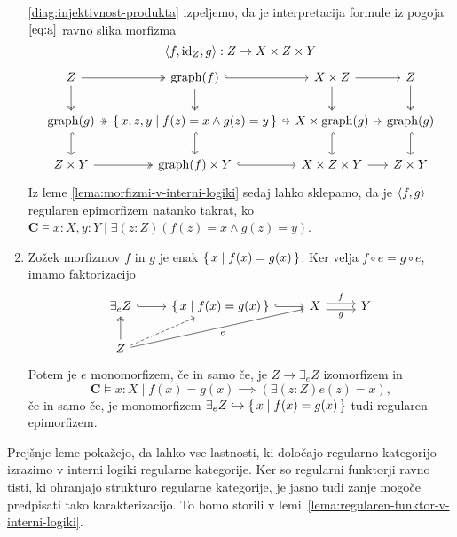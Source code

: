 \documentclass[../kategoricna_logika.tex]{subfiles}
\begin{document}
\begin{dokaz}
\begin{enumerate}[label=(\roman*)]
      \eqref{diag:injektivnost-produkta} izpeljemo, da je
      interpretacija formule iz pogoja $\eqref{eq:a}$ ravno slika morfizma
      \[\langle f, \mathrm{id}_{Z}, g \rangle : Z \to X \times Z \times Y\]
      \begin{equation*}
        \begin{tikzcd}[column sep=tiny]
          Z \ar[d, two heads] \ar[r, two heads] & \mathrm{graph}(f)
          \ar[d, two heads] \ar[r, hook] &
          X \times Z \ar[d, two heads] \ar[r] & Z \ar[d, two heads] \\
          \mathrm{graph}(g) \ar[d, hook] \ar[r, two heads] &
          \set{x,z,y \mid f(z) = x \land g(z) = y} \ar[d, hook] \ar[r,
          hook] & X \times \mathrm{graph}(g) \ar[d, hook] \ar[r] &
          \mathrm{graph}(g) \ar[d, hook] \\
          Z \times Y \ar[r, two heads] & \mathrm{graph}(f) \times Y
          \ar[r, hook] & X \times Z \times Y \ar[r] & Z \times Y
        \end{tikzcd}
      \end{equation*}
      Iz leme \ref{lema:morfizmi-v-interni-logiki} sedaj lahko
      sklepamo, da je $\langle f,g \rangle$ regularen epimorfizem natanko
      takrat, ko
      $\mathbf{C} \models x:X,y:Y \mid \exists (z:Z) (f(z) = x \land g(z) = y)$.
      
    \item Zožek morfizmov $f$ in $g$ je enak
      $\lbrace\,x \mid f(x) = g(x)\,\rbrace$.  Ker velja
      ${f \circ e = g \circ e}$, imamo faktorizacijo
      \begin{equation*}
        \begin{tikzcd}
          \exists_{e}Z \ar[r, hook] & \set{x \mid f(x) = g(x)} \ar[r,
          hook] &
          X \ar[r, shift left, "f"] \ar[r, shift right, "g"'] & Y \\
          Z \ar[u, two heads] \ar[ur, dashed] \ar[urr, "e"']
        \end{tikzcd}
      \end{equation*}
      Potem je $e$ monomorfizem, če in samo če, je
      $Z \to \exists_{e}Z$ izomorfizem in
      \[\mathbf{C} \models x:X \mid f(x) = g(x) \implies (\exists (z:Z) e(z) =
        x),\] če in samo če, je monomorfizem
      $\exists_{e}Z \hookrightarrow \lbrace\,x \mid f(x) = g(x)\,\rbrace$ tudi
      regularen epimorfizem.
    \end{enumerate}
  \end{dokaz}%
  Prejšnje leme pokažejo, da lahko vse lastnosti, ki določajo
  regularno kategorijo izrazimo v interni logiki regularne kategorije.
  Ker so regularni funktorji ravno tisti, ki ohranjajo strukturo regularne
  kategorije, je jasno tudi zanje mogoče predpisati tako karakterizacijo.
  To bomo storili v lemi~\ref{lema:regularen-funktor-v-interni-logiki}.
%
\end{document}
